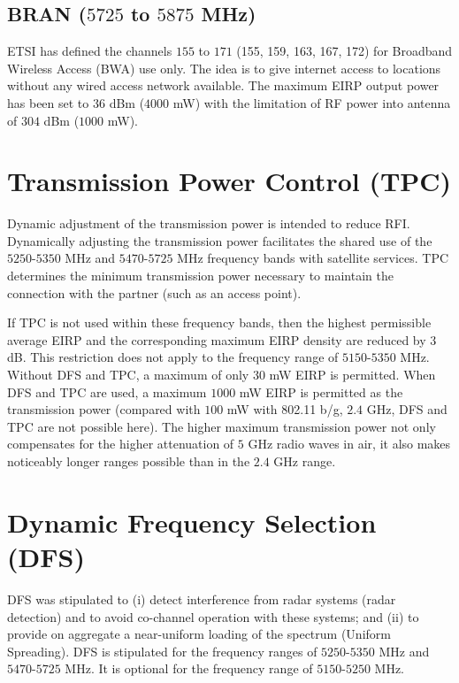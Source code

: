 \subsection{BRAN ($5725$ to $5875$ MHz)}

ETSI has defined the channels $155$ to $171$ (155, 159, 163, 167, 172) for Broadband Wireless Access (BWA) use only. The idea is to give internet access to locations without any wired access network available. The maximum EIRP output power has been set to $36$ dBm ($4000$ mW) with the limitation of RF power into antenna of $304$ dBm ($1000$ mW).


\section{Transmission Power Control (TPC)}

Dynamic adjustment of the transmission power is intended to reduce RFI. Dynamically adjusting the transmission power facilitates the shared use of the $5250$-$5350$ MHz and $5470$-$5725$ MHz frequency bands with satellite services. TPC determines the minimum transmission power necessary to maintain the connection with the partner (such as an access point).

If TPC is not used within these frequency bands, then the highest permissible average EIRP and the corresponding maximum EIRP density are reduced by $3$ dB. This restriction does not apply to the frequency range of $5150$-$5350$ MHz. Without DFS and TPC, a maximum of only $30$ mW EIRP is permitted. When DFS and TPC are used, a maximum $1000$ mW EIRP is permitted as the transmission power (compared with $100$ mW with 802.11 b/g, $2.4$ GHz, DFS and TPC are not possible here). The higher maximum transmission power not only compensates for the higher attenuation of $5$ GHz radio waves in air, it also makes noticeably longer ranges possible than in the $2.4$ GHz range. 


\section{Dynamic Frequency Selection (DFS)}

DFS was stipulated to (i) detect interference from radar systems (radar detection) and to avoid co-channel operation with these systems; and (ii) to provide on aggregate a near-uniform loading of the spectrum (Uniform Spreading). DFS is stipulated for the frequency ranges of $5250$-$5350$ MHz and $5470$-$5725$ MHz. It is optional for the frequency range of $5150$-$5250$ MHz.

